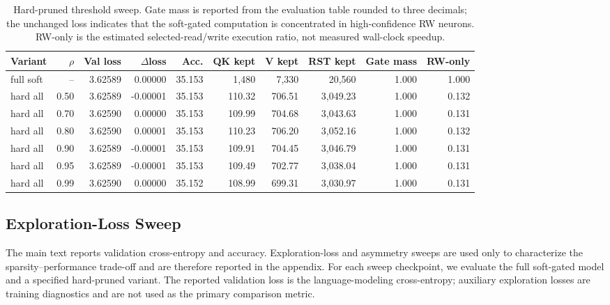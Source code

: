 \documentclass{article}
\begin{document}
\begin{table}[t]
\centering
\small
\setlength{\tabcolsep}{4pt}
\renewcommand{\arraystretch}{1.08}
\begin{tabular}{lrrrrrrrrr}
\toprule
Variant & $\rho$ & Val loss & $\Delta$loss & Acc. & QK kept & V kept & RST kept & Gate mass & RW-only \\
\midrule
full soft & -- & 3.62589 & 0.00000 & 35.153 & 1,480 & 7,330 & 20,560 & 1.000 & 1.000 \\
hard all & 0.50 & 3.62589 & -0.00001 & 35.153 & 110.32 & 706.51 & 3,049.23 & 1.000 & 0.132 \\
hard all & 0.70 & 3.62590 & 0.00000 & 35.153 & 109.99 & 704.68 & 3,043.63 & 1.000 & 0.131 \\
hard all & 0.80 & 3.62590 & 0.00001 & 35.153 & 110.23 & 706.20 & 3,052.16 & 1.000 & 0.132 \\
hard all & 0.90 & 3.62589 & -0.00001 & 35.153 & 109.91 & 704.45 & 3,046.79 & 1.000 & 0.131 \\
hard all & 0.95 & 3.62589 & -0.00001 & 35.153 & 109.49 & 702.77 & 3,038.04 & 1.000 & 0.131 \\
hard all & 0.99 & 3.62590 & 0.00000 & 35.152 & 108.99 & 699.31 & 3,030.97 & 1.000 & 0.131 \\
\bottomrule
\end{tabular}
\caption{Hard-pruned threshold sweep. Gate mass is reported from the evaluation table rounded to three decimals; the unchanged loss indicates that the soft-gated computation is concentrated in high-confidence RW neurons. RW-only is the estimated selected-read/write execution ratio, not measured wall-clock speedup.}
\label{tab:hard_pruned_threshold_sweep}
\end{table}

\subsection{Exploration-Loss Sweep}

The main text reports validation cross-entropy and accuracy. Exploration-loss and asymmetry sweeps are used only to characterize the sparsity--performance trade-off and are therefore reported in the appendix. For each sweep checkpoint, we evaluate the full soft-gated model and a specified hard-pruned variant. The reported validation loss is the language-modeling cross-entropy; auxiliary exploration losses are training diagnostics and are not used as the primary comparison metric.
\end{document}
